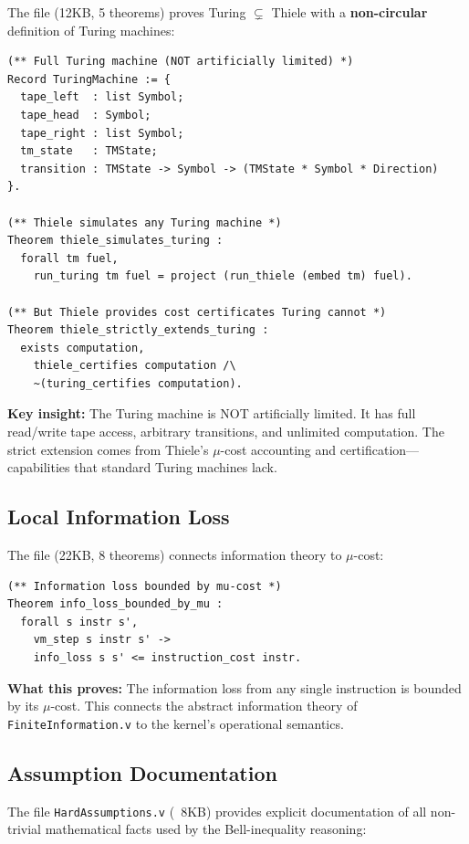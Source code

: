 The file  (12KB, 5 theorems) proves Turing $\subsetneq$ Thiele with a \textbf{non-circular} definition of Turing machines:

\begin{lstlisting}
(** Full Turing machine (NOT artificially limited) *)
Record TuringMachine := {
  tape_left  : list Symbol;
  tape_head  : Symbol;
  tape_right : list Symbol;
  tm_state   : TMState;
  transition : TMState -> Symbol -> (TMState * Symbol * Direction)
}.

(** Thiele simulates any Turing machine *)
Theorem thiele_simulates_turing :
  forall tm fuel,
    run_turing tm fuel = project (run_thiele (embed tm) fuel).

(** But Thiele provides cost certificates Turing cannot *)
Theorem thiele_strictly_extends_turing :
  exists computation,
    thiele_certifies computation /\
    ~(turing_certifies computation).
\end{lstlisting}

\textbf{Key insight:} The Turing machine is NOT artificially limited. It has full read/write tape access, arbitrary transitions, and unlimited computation. The strict extension comes from Thiele's $\mu$-cost accounting and certification---capabilities that standard Turing machines lack.

\subsection{Local Information Loss}

The file  (22KB, 8 theorems) connects information theory to $\mu$-cost:

\begin{lstlisting}
(** Information loss bounded by mu-cost *)
Theorem info_loss_bounded_by_mu :
  forall s instr s',
    vm_step s instr s' ->
    info_loss s s' <= instruction_cost instr.
\end{lstlisting}

\textbf{What this proves:} The information loss from any single instruction is bounded by its $\mu$-cost. This connects the abstract information theory of \texttt{FiniteInformation.v} to the kernel's operational semantics.

\subsection{Assumption Documentation}

The file \texttt{HardAssumptions.v} (~8KB) provides explicit documentation of all non-trivial mathematical facts used by the Bell-inequality reasoning:

